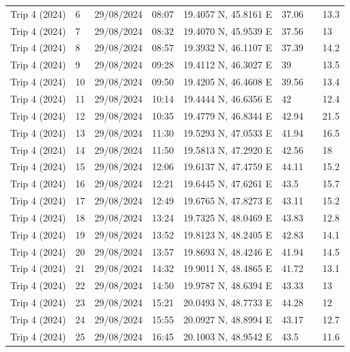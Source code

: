 \begin{scriptsize}
\begin{longtable}{llllllll}
Trip 4 (2024) & 6 & 29/08/2024 & 08:07 & 19.4057 N, 45.8161 E & 37.06 & \textemdash{} & 13.3 \\
Trip 4 (2024) & 7 & 29/08/2024 & 08:32 & 19.4070 N, 45.9539 E & 37.56 & \textemdash{} & 13 \\
Trip 4 (2024) & 8 & 29/08/2024 & 08:57 & 19.3932 N, 46.1107 E & 37.39 & \textemdash{} & 14.2 \\
Trip 4 (2024) & 9 & 29/08/2024 & 09:28 & 19.4112 N, 46.3027 E & 39 & \textemdash{} & 13.5 \\
Trip 4 (2024) & 10 & 29/08/2024 & 09:50 & 19.4205 N, 46.4608 E & 39.56 & \textemdash{} & 13.4 \\
Trip 4 (2024) & 11 & 29/08/2024 & 10:14 & 19.4444 N, 46.6356 E & 42 & \textemdash{} & 12.4 \\
Trip 4 (2024) & 12 & 29/08/2024 & 10:35 & 19.4779 N, 46.8344 E & 42.94 & \textemdash{} & 21.5 \\
Trip 4 (2024) & 13 & 29/08/2024 & 11:30 & 19.5293 N, 47.0533 E & 41.94 & \textemdash{} & 16.5 \\
Trip 4 (2024) & 14 & 29/08/2024 & 11:50 & 19.5813 N, 47.2920 E & 42.56 & \textemdash{} & 18 \\
Trip 4 (2024) & 15 & 29/08/2024 & 12:06 & 19.6137 N, 47.4759 E & 44.11 & \textemdash{} & 15.2 \\
Trip 4 (2024) & 16 & 29/08/2024 & 12:21 & 19.6445 N, 47.6261 E & 43.5 & \textemdash{} & 15.7 \\
Trip 4 (2024) & 17 & 29/08/2024 & 12:49 & 19.6765 N, 47.8273 E & 43.11 & \textemdash{} & 15.2 \\
Trip 4 (2024) & 18 & 29/08/2024 & 13:24 & 19.7325 N, 48.0469 E & 43.83 & \textemdash{} & 12.8 \\
Trip 4 (2024) & 19 & 29/08/2024 & 13:52 & 19.8123 N, 48.2405 E & 42.83 & \textemdash{} & 14.1 \\
Trip 4 (2024) & 20 & 29/08/2024 & 13:57 & 19.8693 N, 48.4246 E & 41.94 & \textemdash{} & 14.5 \\
Trip 4 (2024) & 21 & 29/08/2024 & 14:32 & 19.9011 N, 48.4865 E & 41.72 & \textemdash{} & 13.1 \\
Trip 4 (2024) & 22 & 29/08/2024 & 14:50 & 19.9787 N, 48.6394 E & 43.33 & \textemdash{} & 13 \\
Trip 4 (2024) & 23 & 29/08/2024 & 15:21 & 20.0493 N, 48.7733 E & 44.28 & \textemdash{} & 12 \\
Trip 4 (2024) & 24 & 29/08/2024 & 15:55 & 20.0927 N, 48.8994 E & 43.17 & \textemdash{} & 12.7 \\
Trip 4 (2024) & 25 & 29/08/2024 & 16:45 & 20.1003 N, 48.9542 E & 43.5 & \textemdash{} & 11.6 \\

\end{longtable}
\end{scriptsize}
